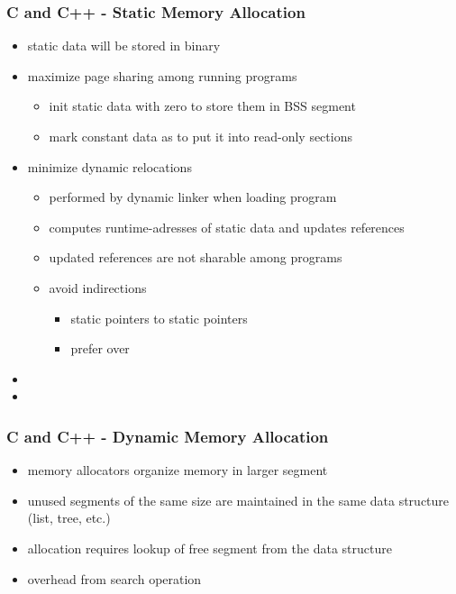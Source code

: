 \begin{frame}
 \frametitle{C and C++ - Static Memory Allocation}
 \begin{itemize}
  \item static data will be stored in binary
  \item maximize page sharing among running programs
  \begin{itemize}
   \item init static data with zero to store them in BSS segment
   \item mark constant data as  to put it into read-only sections
  \end{itemize}
  \item minimize dynamic relocations
  \begin{itemize}
   \item performed by dynamic linker when loading program
   \item computes runtime-adresses of static data and updates references
   \item updated references are not sharable among programs
   \item avoid indirections
    \begin{itemize}
     \item static pointers to static pointers
     \item prefer  over 
    \end{itemize}
  \end{itemize}
  \item {}
  \item {}
 \end{itemize}
\end{frame}

\begin{frame}
 \frametitle{C and C++ - Dynamic Memory Allocation}
 \begin{itemize}
  \item memory allocators organize memory in larger segment
  \item unused segments of the same size are maintained in the same data structure (list, tree, etc.)
  \item allocation requires lookup of free segment from the data structure
  \item overhead from search operation
 \end{itemize}
\end{frame}

